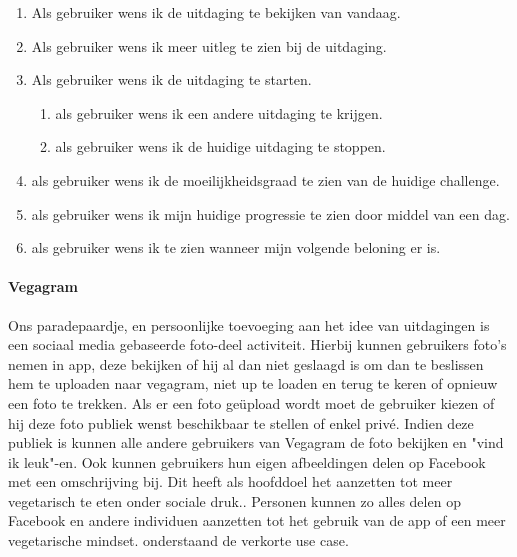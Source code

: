  \begin{enumerate}
 	\item Als gebruiker wens ik de uitdaging te bekijken van vandaag.
 	\item Als gebruiker wens ik meer uitleg te zien bij de uitdaging.
 	\item Als gebruiker wens ik de uitdaging te starten.
 	 	 \begin{enumerate}
 		\item als gebruiker wens ik een andere uitdaging te krijgen.
 		\item als gebruiker wens ik de huidige uitdaging te stoppen.
 	\end{enumerate}
 \item als gebruiker wens ik de moeilijkheidsgraad te zien van de huidige challenge.
 \item als gebruiker wens ik mijn huidige progressie te zien door middel van een dag.
 \item als gebruiker wens ik te zien wanneer mijn volgende beloning er is.
 \end{enumerate}

\paragraph{Vegagram}

Ons paradepaardje, en persoonlijke toevoeging aan het idee van uitdagingen is een sociaal media gebaseerde foto-deel activiteit. Hierbij kunnen gebruikers foto's nemen in app, deze bekijken of hij al dan niet geslaagd is om dan te beslissen hem te uploaden naar vegagram, niet up te loaden en terug te keren of opnieuw een foto te trekken. Als er een foto geüpload wordt moet de gebruiker kiezen of hij deze foto publiek wenst beschikbaar te stellen of enkel privé. Indien deze publiek is kunnen alle andere gebruikers van Vegagram de foto bekijken en "vind ik leuk"-en. Ook kunnen gebruikers hun eigen afbeeldingen delen op Facebook met een omschrijving bij. Dit heeft als hoofddoel het aanzetten tot meer vegetarisch te eten onder sociale druk.. Personen kunnen zo alles delen op Facebook en andere individuen aanzetten tot het gebruik van de app of een meer vegetarische mindset. onderstaand de verkorte use case.


